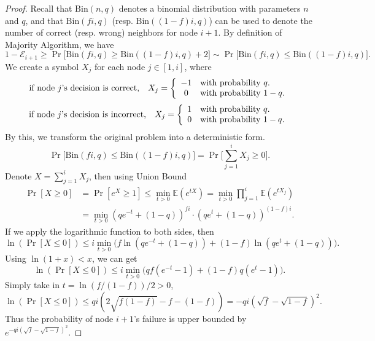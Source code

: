\documentclass[a4paper,UKenglish]{lipics}
\theoremstyle{definition}
\newcommand\E{\mathbb{E}}
\begin{document}
\begin{proof}
Recall that $\text{Bin}(n,q)$ denotes a binomial distribution with parameters $n$ and $q$,
	and that $\text{Bin}(fi, q)$ (resp. $\text{Bin}((1-f)i, q)$) can be used to denote the number of correct (resp. wrong) neighbors for node $i+1$.
By definition of Majority Algorithm, we have
\begin{equation*}
	1 - \mathcal{E}_{i+1}
\ge
	\Pr\Big[ 
		\text{Bin}(fi, q) \ge \text{Bin}((1-f)i, q) + 2 
	\Big]
\sim
	\Pr \Big[ 
		\text{Bin}(fi, q) \le \text{Bin}((1-f)i, q)
	\Big ].
\end{equation*}
We create a symbol $X_j$ for each node $j \in [1, i]$, where
\begin{equation*}
\text{if node $j$'s decision is correct, }~~
	X_j =
	\left \{
	\begin{array} {c l}
		-1 & \text{with probability $q$.} \\
		0 & \text{with probability $1-q$.}
	\end{array}
	\right.
\end{equation*}
\begin{equation*}
\text{if node $j$'s decision is incorrect, }~~
	X_j =
	\left \{
	\begin{array} {c l}
		1 & \text{with probability $q$.} \\
		0 & \text{with probability $1-q$.}
	\end{array}
	\right.
\end{equation*}
By this, we transform the original problem into a deterministic form.
\begin{equation*}
	\Pr \Big[ 
		\text{Bin}(fi, q) \le \text{Bin}((1-f)i, q)
	\Big]
=
	\Pr\Big[
		\sum_{j=1}^i X_j \ge 0
	\Big].
\end{equation*}
Denote $X = \sum_{j=1}^i X_j$, then using Union Bound
\begin{align*}
	\Pr[X \ge 0]
& =
	\Pr[e^{X} \ge 1 ]
 	\le
	\min_{t>0} \E(e^{tX})
	=
	\min_{t>0}\prod_{j = 1}^{i}\E(e^{tX_j})  \\
& =
	\min_{t > 0} (qe^{-t} + (1-q))^{fi}\cdot (qe^{t} + (1-q))^{(1-f)i}.
\end{align*}
If we apply the logarithmic function to both sides, then
\begin{equation*}
	\ln (\Pr[X \le 0])
\le
	i\min_{t>0} \Big( f \ln(qe^{-t} + (1-q)) + (1-f)\ln (qe^{t} + (1-q)) \Big).
\end{equation*}
Using $\ln(1+x) < x$, we can get
\begin{equation*}
	\ln (\Pr[X \le 0])
\le
	i\min_{t>0} \Big( qf(e^{-t} - 1) + (1-f)q(e^{t} - 1) \Big).
\end{equation*}
Simply take in $t = \ln (f/(1-f)) / 2 > 0$,
\begin{equation*}
	\ln (\Pr[X \le 0])
\le
	qi (2\sqrt{f(1-f)} - f - (1-f))
=
	-qi(\sqrt{f} - \sqrt{1-f})^2.
\end{equation*}
Thus the probability of node $i+1$'s failure is upper bounded by $e^{-qi(\sqrt{f} - \sqrt{1-f})^2}.$
\end{proof}
\end{document}
